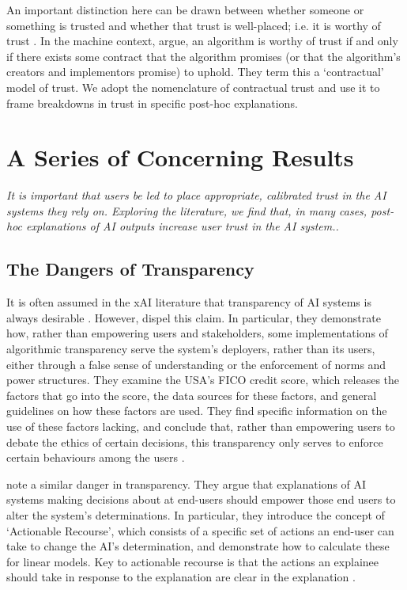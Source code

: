 An important distinction here can be drawn between whether someone or something is trusted and whether that trust is well-placed; i.e. it is worthy of trust \cite{hardin_trust_2002}. In the machine context, \textcite{jacovi_formalizing_2021} argue, an algorithm is worthy of trust if and only if there exists some contract that the algorithm promises (or that the algorithm's creators and implementors promise) to uphold. They term this a `contractual' model of trust. We adopt the nomenclature of contractual trust and use it to frame breakdowns in trust in specific post-hoc explanations.

\section{A Series of Concerning Results}
\emph{It is important that users be led to place appropriate, calibrated trust in the AI systems they rely on. Exploring the literature, we find that, in many cases, post-hoc explanations of AI outputs increase user trust in the AI system..}

\subsection{The Dangers of Transparency}
It is often assumed in the xAI literature that transparency of AI systems is always desirable \cite{molnar_interpretable_2019,miller_explanation_2017-1}. However, \textcite{wang_transparency_2022} dispel this claim. In particular, they demonstrate how, rather than empowering users and stakeholders, some implementations of algorithmic transparency serve the system's deployers, rather than its users, either through a false sense of understanding or the enforcement of norms and power structures. They examine the USA's FICO credit score, which releases the factors that go into the score, the data sources for these factors, and general guidelines on how these factors are used. They find specific information on the use of these factors lacking, and conclude that, rather than empowering users to debate the ethics of certain decisions, this transparency only serves to enforce certain behaviours among the users \cite{wang_transparency_2022}.

\textcite{ustun_actionable_2019} note a similar danger in transparency. They argue that explanations of AI systems making decisions about at end-users should empower those end users to alter the system's determinations. In particular, they introduce the concept of `Actionable Recourse', which consists of a specific set of actions an end-user can take to change the AI's determination, and demonstrate how to calculate these for linear models. Key to actionable recourse is that the actions an explainee should take in response to the explanation are clear in the explanation \cite{ustun_actionable_2019}.

